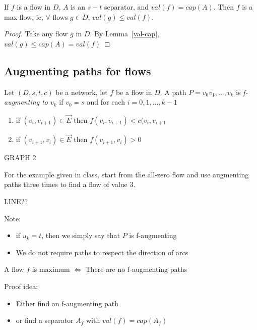 \documentclass{article}
\begin{document}
\begin{cor}
\label{valg}
If $f$ is a flow in $D$, $A$ is an $s-t$ separator, and $val(f)=cap(A)$.  Then $f$ is a max flow, ie, $\forall$ flows $g \in D$, $val(g) \leq val(f)$.
\end{cor}

\begin{proof}
Take any flow $g$ in $D$. By Lemma~\ref{val-cap}, $val(g) \leq cap(A) = val(f)$
\end{proof}

\subsection*{Augmenting paths for flows}

\begin{defn}
Let $(D,s,t,c)$ be a network, let $f$ be a flow in $D$.  A path $P=v_0 v_1, \ldots, v_k$ is \emph{f-augmenting to $v_k$} if $v_0 = s$ and for each $i=0,1, \ldots, {k-1}$ 
\begin{enumerate}
 \item if $(v_i, v_{i+1}) \in \overrightarrow{E}$ then $f(v_i, v_{i+1}) < c(v_i,v_{i+1}$
\item if $(v_{i+1}, v_i) \in \overrightarrow{E}$ then $f(v_{i+1}, v_i) >0 $
\end{enumerate}
\end{defn}

\begin{examp}
GRAPH 2 
\end{examp}

\begin{exer}
For the example given in class, start from the all-zero flow and use augmenting paths three times to find a flow of value 3. 
\end{exer}

LINE??

Note: \begin{itemize}
 \item  if $u_k = t$, then we simply say that $P$ is f-augmenting
\item We do not require paths to respect the direction of arcs
\end{itemize}

\begin{lem}
\label{maxflow}
A flow $f$ is maximum  $\iff$ There are no f-augmenting paths
\end{lem}

Proof idea: \begin{itemize}
 \item Either find an f-augmenting path 
\item or find a separator $A_f$ with $val(f) = cap(A_f)$
\end{itemize}
\end{document}
